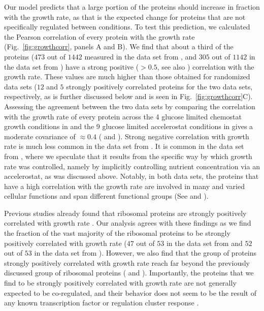 \documentclass[10pt,letterpaper]{article}
\newcommand{\hTotal}{$1442$}
\newcommand{\hGlobal}{$473$}
\newcommand{\hGlobalShuff}{$12$}
\newcommand{\vnTotal}{$1142$}
\newcommand{\vTotal}{\vnTotal{}}
\newcommand{\vnGlobalShuff}{$5$}
\newcommand{\vGlobalShuff}{\vnGlobalShuff{}}
\newcommand{\vnGlobal}{$305$}
\newcommand{\vGlobal}{\vnGlobal{}}
\newcommand{\hRibs}{$53$}
\newcommand{\hCorrRibs}{$47$}
\newcommand{\vnRibs}{$53$}
\newcommand{\vRibs}{\vnRibs{}}
\newcommand{\vnCorrRibs}{$52$}
\newcommand{\vCorrRibs}{\vnCorrRibs{}}
\begin{document}
Our model predicts that a large portion of the proteins should increase in fraction with the growth rate, as that is the expected change for proteins that are not specifically regulated between conditions.
To test this prediction, we calculated the Pearson correlation of every protein with the growth rate (Fig.~\ref{fig:growthcorr}, panels A and B).
We find that about a third of the proteins (\hGlobal{} out of \hTotal{} measured in the data set from \cite{Schmidt2015}, and \vGlobal{} out of \vTotal{} in the data set from \cite{Peebo_2015}) have a strong positive ($>0.5$, see also ) correlation with the growth rate.
These values are much higher than those obtained for randomized data sets (\hGlobalShuff{} and \vGlobalShuff{} strongly positively correlated proteins for the two data sets, respectively, as is further discussed below and is seen in Fig.~\ref{fig:growthcorr}C).
Assessing the agreement between the two data sets by comparing the correlation with the growth rate of every protein across the 4 glucose limited chemostat growth conditions in \cite{Schmidt2015} and the 9 glucose limited accelerostat conditions in \cite{Peebo_2015} gives a moderate covariance of $\approx 0.4$ ( and ).
Strong negative correlation with growth rate is much less common in the data set from \cite{Schmidt2015}.
It is common in the data set from \cite{Peebo_2015}, where we speculate that it results from the specific way by which growth rate was controlled, namely by implicitly controlling nutrient concentration via an accelerostat, as was discussed above.
Notably, in both data sets, the proteins that have a high correlation with the growth rate are involved in many and varied cellular functions and span different functional groups (See  and ).


Previous studies already found that ribosomal proteins are strongly positively correlated with growth rate \cite{Pedersen1978a, ingraham1983growth, Klumpp2008}.
Our analysis agrees with these findings as we find the fraction of the vast majority of the ribosomal proteins to be strongly positively correlated with growth rate (\hCorrRibs{} out of \hRibs{} in the data set from \cite{Schmidt2015} and \vCorrRibs{} out of \vRibs{} in the data set from \cite{Peebo_2015}).
However, we also find that the group of proteins strongly positively correlated with growth rate reach far beyond the previously discussed group of ribosomal proteins ( and ).
Importantly, the proteins that we find to be strongly positively correlated with growth rate are not generally expected to be co-regulated, and their behavior does not seem to be the result of any known transcription factor or regulation cluster response \cite{23203884}.
\end{document}

